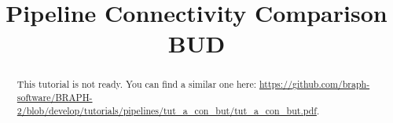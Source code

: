 \documentclass[justified]{tufte-handout}
\title{Pipeline Connectivity Comparison BUD}
\begin{document}
\maketitle

\begin{abstract}
\noindent
This tutorial is not ready. You can find a similar one here: \url{https://github.com/braph-software/BRAPH-2/blob/develop/tutorials/pipelines/tut_a_con_but/tut_a_con_but.pdf}.
\end{abstract}
\end{document}
